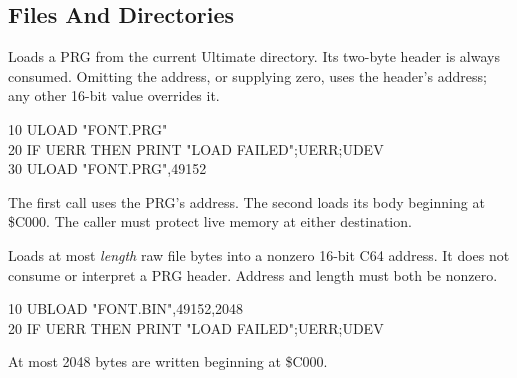 \begin{referencechapter}
\section{Files And Directories}




Loads a PRG from the current Ultimate directory. Its two-byte header is always
consumed. Omitting the address, or supplying zero, uses the header's address;
any other 16-bit value overrides it.

\begin{screen}
10 ULOAD "FONT.PRG"\\
20 IF UERR THEN PRINT "LOAD FAILED";UERR;UDEV\\
30 ULOAD "FONT.PRG",49152
\end{screen}

\begin{resultbox}
The first call uses the PRG's address. The second loads its body beginning at
\$C000. The caller must protect live memory at either destination.
\end{resultbox}




Loads at most \textit{length} raw file bytes into a nonzero 16-bit C64 address.
It does not consume or interpret a PRG header. Address and length must both be
nonzero.

\begin{screen}
10 UBLOAD "FONT.BIN",49152,2048\\
20 IF UERR THEN PRINT "LOAD FAILED";UERR;UDEV
\end{screen}

\begin{resultbox}
At most 2048 bytes are written beginning at \$C000.
\end{resultbox}



\end{referencechapter}
